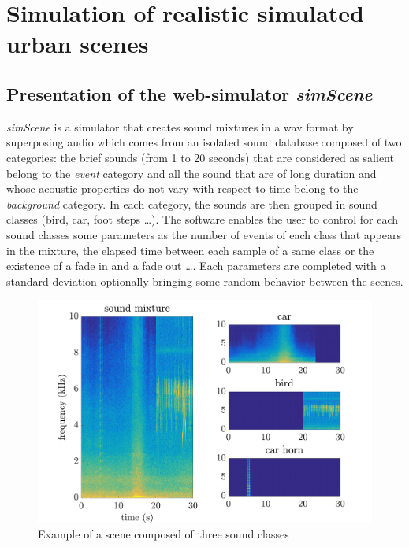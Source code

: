 \documentclass[a4,11pt,twocolumn]{article}
\begin{document}
\section{Simulation of realistic simulated urban scenes} \label{sec:simulation}
\subsection{Presentation of the web-simulator \textit{simScene}}
\textit{simScene} \cite{rossignol_simscene:_2015} is a simulator that creates sound mixtures in a wav format by superposing audio which comes from an isolated sound database composed of two categories: the brief sounds (from 1 to 20 seconds)
that are considered as salient belong to the \textit{event} category and all the sound that are of long duration and whose acoustic properties do not vary with respect to time belong to the \textit{background} category. In each category, the sounds are then grouped in sound classes (bird, car, foot steps \dots). The software enables the user to control for each sound classes some parameters as the number of events of each class that appears in the mixture, the elapsed time between each sample of a same class or the existence of a fade in and a fade out \dots. Each parameters are completed with a standard deviation optionally bringing some random behavior between the scenes. \\


\begin{figure}[h]
\centering
\includegraphics[width = \linewidth]{./pictures/spectrogramme_abstract_sceneSimpleKlaxonFixe_EN.pdf}
\caption{Example of a scene composed of three sound classes}
\label{fig:exampleSimScene}
\end{figure}
\end{document}
